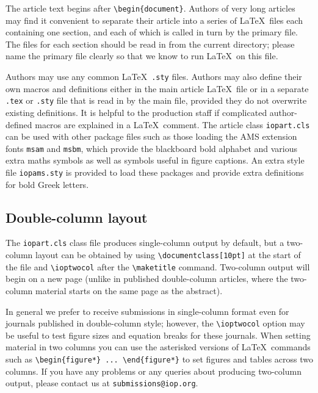 \documentclass[12pt]{iopart}
\begin{document}
The article text begins after \verb"\begin{document}".
Authors of very long articles may find it convenient to separate 
their article into a series of \LaTeX\ files each containing one section, and each of which is called 
in turn by the primary file.  The files for each section should be read in from the current directory;
please name the primary file clearly so that we know to run \LaTeX\ on this file.

Authors may use any common \LaTeX\ \verb".sty" files.
Authors may also define their own macros and definitions either in the main article \LaTeX\ file
or in a separate \verb".tex" or \verb".sty" file that is read in by the
main file, provided they do not overwrite existing definitions.
It is helpful to the production staff if complicated author-defined macros are explained in a \LaTeX\ comment.
The article class \verb"iopart.cls" can be used with other package files such
as those loading the AMS extension fonts 
\verb"msam" and \verb"msbm", which provide the 
blackboard bold alphabet and various extra maths symbols as well as symbols useful in figure 
captions.  An extra style file \verb"iopams.sty" is provided to load these
packages and provide extra definitions for bold Greek letters.

\subsection{\label{dblcol}Double-column layout}
The \verb"iopart.cls" class file produces single-column output by default, but a two-column layout can be obtained by
using \verb"\documentclass[10pt]" at the start of the file and \verb"\ioptwocol" after the \verb"\maketitle" command.  Two-column output will begin
on a new page (unlike in published double-column articles, where the two-column material
starts on the same page as the abstract).

In general we prefer to receive submissions in single-column format even for journals
published in double-column style; however, the \verb"\ioptwocol" option may be useful to test figure sizes
and equation breaks for these journals.  When setting material
in two columns you can use the asterisked versions of \LaTeX\ commands such as \verb"\begin{figure*} ... \end{figure*}"
to set figures and tables across two columns.  If you have any problems or any queries about producing two-column output, please contact us at \verb"submissions@iop.org".
\end{document}
